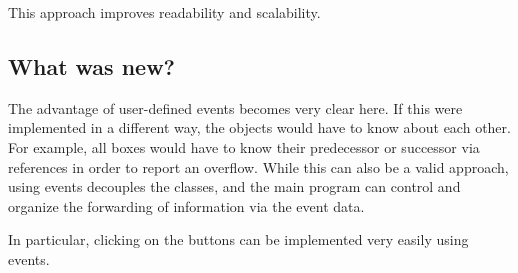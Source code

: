 This approach improves readability and scalability.

\subsection{What was new?}
\begin{hintbox}
The advantage of user-defined events becomes very clear here. If this were implemented in a different way, the objects would have to know about each other. For example, all boxes would have to know their predecessor or successor via references in order to report an overflow. While this can also be a valid approach, using events decouples the classes, and the main program can control and organize the forwarding of information via the event data.

In particular, clicking on the buttons can be implemented very easily using events.
\end{hintbox}

